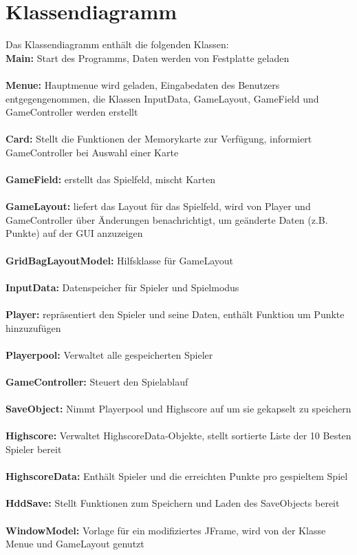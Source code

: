 \clearpage

\chapter{Klassendiagramm}
Das Klassendiagramm enthält die folgenden Klassen:\\

\noindent \textbf{Main: } Start des Programms, Daten werden von Festplatte geladen \\ \\
\textbf{Menue: } Hauptmenue wird geladen, Eingabedaten des Benutzers entgegengenommen, die Klassen InputData, GameLayout, GameField und GameController werden erstellt \\ \\
\textbf{Card: } Stellt die Funktionen der Memorykarte zur Verfügung, informiert GameController bei Auswahl einer Karte \\ \\
\textbf{GameField: } erstellt das Spielfeld, mischt Karten\\ \\
\textbf{GameLayout: } liefert das Layout für das Spielfeld, wird von Player und GameController über Änderungen benachrichtigt, um geänderte Daten (z.B. Punkte) auf der GUI anzuzeigen\\ \\
\textbf{GridBagLayoutModel: }Hilfsklasse für GameLayout\\ \\
\textbf{InputData: } Datenspeicher für Spieler und Spielmodus\\ \\
\textbf{Player: } repräsentiert den Spieler und seine Daten, enthält Funktion um Punkte hinzuzufügen\\ \\
\textbf{Playerpool: } Verwaltet alle gespeicherten Spieler\\ \\
\textbf{GameController: } Steuert den Spielablauf\\ \\
\textbf{SaveObject: } Nimmt Playerpool und Highscore auf um sie gekapselt zu speichern\\ \\
\textbf{Highscore: } Verwaltet HighscoreData-Objekte, stellt sortierte Liste der 10 Besten Spieler bereit\\ \\
\textbf{HighscoreData: } Enthält Spieler und die erreichten Punkte pro gespieltem Spiel \\ \\
\textbf{HddSave: } Stellt Funktionen zum Speichern und Laden des SaveObjects bereit\\ \\
\textbf{WindowModel: } Vorlage für ein modifiziertes JFrame, wird von der Klasse Menue und GameLayout genutzt \\ \\

